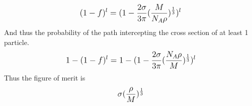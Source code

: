 \documentclass[12pt]{article}
\begin{document}
\begin{equation}\label{eqn:isParticleInBox}
\begin{split}
\mathlarger{
(1-f)^l = (1-\frac{2\sigma}{3\pi}(\frac{M}{N_A\rho})^{\frac{1}{3}})^l
}\\
\end{split}
\end{equation}
And thus the probability of the path intercepting the cross section of at least 1 particle.
\begin{equation}\label{eqn:isParticleInBox}
\begin{split}
\mathlarger{
1-(1-f)^l = 1-(1-\frac{2\sigma}{3\pi}(\frac{N_A\rho}{M})^{\frac{1}{3}})^l
}\\
\end{split}
\end{equation}
Thus the figure of merit is 
\begin{equation}
\begin{split}
\mathlarger{
\sigma(\frac{\rho}{M})^{\frac{1}{3}}
}\\
\end{split}
\end{equation}
\end{document}

